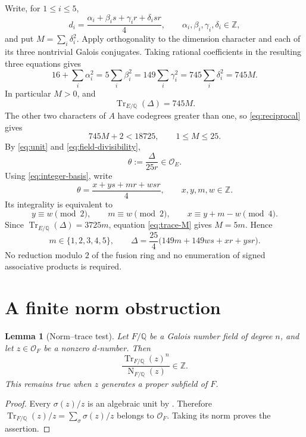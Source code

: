 \documentclass[11pt]{article}
\newtheorem{lemma}[theorem]{Lemma}
\newcommand{\Q}{\mathbb Q}
\newcommand{\Z}{\mathbb Z}
\newcommand{\Tr}{\operatorname{Tr}}
\newcommand{\Nm}{\operatorname{N}}
\newcommand{\OO}{\mathcal O}
\numberwithin{equation}{section}
\begin{document}
Write, for $1\le i\le5$,
\[
d_i=\frac{\alpha_i+\beta_i s+\gamma_i r+\delta_i sr}{4},
\qquad \alpha_i,\beta_i,\gamma_i,\delta_i\in\Z,
\]
and put $M=\sum_i\delta_i^2$. Apply orthogonality to the dimension character
and each of its three nontrivial Galois conjugates. Taking rational coefficients
in the resulting three equations gives
\begin{equation}\label{eq:equal-norms}
16+\sum_i\alpha_i^2
=5\sum_i\beta_i^2
=149\sum_i\gamma_i^2
=745\sum_i\delta_i^2=745M.
\end{equation}
In particular $M>0$, and
\begin{equation}\label{eq:trace-M}
\Tr_{E/\Q}(\Delta)=745M.
\end{equation}
The other two characters of $A$ have codegrees greater than one, so
\eqref{eq:reciprocal} gives
\[
745M+2<18725,\qquad 1\le M\le25.
\]
By \eqref{eq:unit} and \eqref{eq:field-divisibility},
\begin{equation}\label{eq:theta}
\theta:=\frac{\Delta}{25r}\in\OO_E.
\end{equation}
Using \eqref{eq:integer-basis}, write
\begin{equation}\label{eq:theta-coordinates}
\theta=\frac{x+ys+mr+wsr}{4},\qquad x,y,m,w\in\Z.
\end{equation}
Its integrality is equivalent to
\begin{equation}\label{eq:congruences}
y\equiv w\pmod2,\qquad m\equiv w\pmod2,\qquad
x\equiv y+m-w\pmod4.
\end{equation}
Since $\Tr_{E/\Q}(\Delta)=3725m$, equation \eqref{eq:trace-M} gives $M=5m$.
Hence
\begin{equation}\label{eq:m-range}
m\in\{1,2,3,4,5\},\qquad
\Delta=\frac{25}{4}\bigl(149m+149ws+xr+ysr\bigr).
\end{equation}
No reduction modulo $2$ of the fusion ring and no enumeration of signed
associative products is required.

\section{A finite norm obstruction}
\begin{lemma}[Norm--trace test]\label{lem:norm-trace}
Let $F/\Q$ be a Galois number field of degree $n$, and let $z\in\OO_F$ be a
nonzero $d$-number. Then
\[
\frac{\Tr_{F/\Q}(z)^n}{\Nm_{F/\Q}(z)}\in\Z.
\]
This remains true when $z$ generates a proper subfield of $F$.
\end{lemma}
\begin{proof}
Every $\sigma(z)/z$ is an algebraic unit by
\cite[Lemma 2.7]{Od}. Therefore
$\Tr_{F/\Q}(z)/z=\sum_\sigma\sigma(z)/z$ belongs to $\OO_F$.
Taking its norm proves the assertion.
\end{proof}
\end{document}
